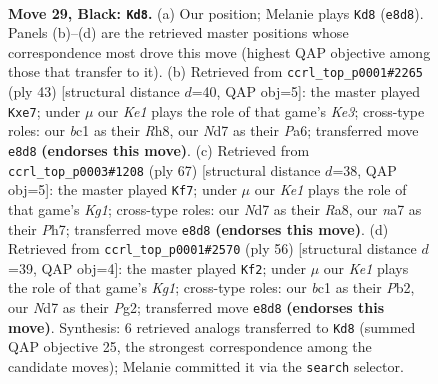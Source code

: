 \documentclass[11pt]{article}
\begin{document}
\clearpage

\begin{figure}[p]\centering
\begin{subfigure}{0.46\textwidth}\centering
\resizebox{\linewidth}{!}{%
\newchessgame
\chessboard[
  setfen={4k1r1/Nppnp2p/6p1/p7/5P1P/2P5/P1n2PK1/2B4R b - - 4 29},
  showmover=false,
  pgfstyle=straightmove, color=movearrow, markmove={e8-d8}
]}
\caption{}
\end{subfigure}\hfill
\begin{subfigure}{0.46\textwidth}\centering
\resizebox{\linewidth}{!}{%
\newchessgame
\chessboard[
  setfen={7r/4N1pp/p1p1kn2/8/1pP5/8/PP3P1P/R1B3K1 b - - 0 22},
  showmover=false,
  pgfstyle=straightmove, color=movearrow, markmove={e6-e7}
]}
\caption{}
\end{subfigure}
\\[4pt]
\begin{subfigure}{0.46\textwidth}\centering
\resizebox{\linewidth}{!}{%
\newchessgame
\chessboard[
  setfen={r5k1/4p2p/6p1/p2Pp3/P3n3/1P6/6PP/2R1B2K b - - 1 34},
  showmover=false,
  pgfstyle=straightmove, color=movearrow, markmove={g8-f7}
]}
\caption{}
\end{subfigure}\hfill
\begin{subfigure}{0.46\textwidth}\centering
\resizebox{\linewidth}{!}{%
\newchessgame
\chessboard[
  setfen={5k2/p1Nb1pp1/3P4/1p2r3/2p3p1/8/PPP3PP/3R2K1 w - - 4 29},
  showmover=false,
  pgfstyle=straightmove, color=movearrow, markmove={g1-f2}
]}
\caption{}
\end{subfigure}
\caption{\textbf{Move 29, Black: \texttt{Kd8}.} (a) Our position; Melanie plays \texttt{Kd8} (\texttt{e8d8}). Panels (b)--(d) are the retrieved master positions whose correspondence most drove this move (highest QAP objective among those that transfer to it). (b) Retrieved from \texttt{ccrl\_top\_p0001\#2265} (ply 43) [structural distance $d$=40, QAP obj=5]: the master played \texttt{Kxe7}; under $\mu$ our \emph{Ke1} plays the role of that game's \emph{Ke3}; cross-type roles: our \emph{b}c1 as their \emph{R}h8, our \emph{N}d7 as their \emph{P}a6; transferred move \texttt{e8d8} \textbf{(endorses this move)}. (c) Retrieved from \texttt{ccrl\_top\_p0003\#1208} (ply 67) [structural distance $d$=38, QAP obj=5]: the master played \texttt{Kf7}; under $\mu$ our \emph{Ke1} plays the role of that game's \emph{Kg1}; cross-type roles: our \emph{N}d7 as their \emph{R}a8, our \emph{n}a7 as their \emph{P}h7; transferred move \texttt{e8d8} \textbf{(endorses this move)}. (d) Retrieved from \texttt{ccrl\_top\_p0001\#2570} (ply 56) [structural distance $d$=39, QAP obj=4]: the master played \texttt{Kf2}; under $\mu$ our \emph{Ke1} plays the role of that game's \emph{Kg1}; cross-type roles: our \emph{b}c1 as their \emph{P}b2, our \emph{N}d7 as their \emph{P}g2; transferred move \texttt{e8d8} \textbf{(endorses this move)}. Synthesis: 6 retrieved analogs transferred to \texttt{Kd8} (summed QAP objective 25, the strongest correspondence among the candidate moves); Melanie committed it via the \texttt{search} selector.}
\label{fig:thought-m57}
\end{figure}
\end{document}
